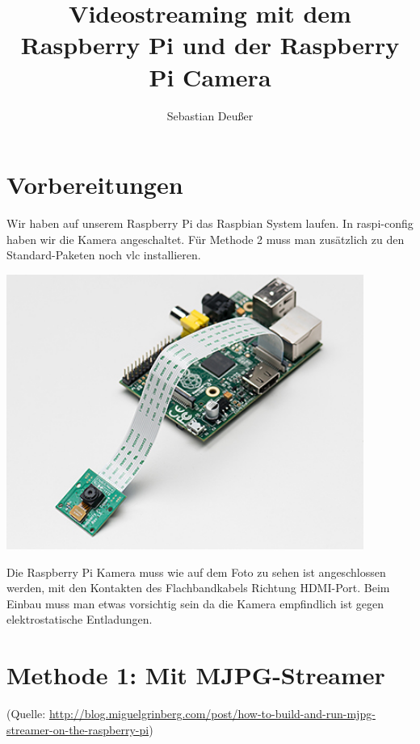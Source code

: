 \documentclass[12pt,a4paper,titlepage]{scrartcl} %
\title{Videostreaming mit dem Raspberry Pi und der Raspberry Pi Camera}
\author{Sebastian Deußer}
\begin{document}
\maketitle %

\pagestyle{fancy}
\lhead{}
\chead{\leftmark}
\rhead{}
\cfoot{}

\thispagestyle{fancy}

\section{Vorbereitungen}
Wir haben auf unserem Raspberry Pi das Raspbian System laufen. In raspi-config haben wir die Kamera angeschaltet. Für Methode 2 muss man zusätzlich zu den Standard-Paketen noch vlc installieren.
	\begin{center}
		\includegraphics[height=9cm]{Streaming/1367_MED}
	\end{center}
Die Raspberry Pi Kamera muss wie auf dem Foto zu sehen ist angeschlossen werden, mit den Kontakten des Flachbandkabels Richtung HDMI-Port. Beim Einbau muss man etwas vorsichtig sein da die Kamera empfindlich ist gegen elektrostatische Entladungen.

\newpage
\section{Methode 1: Mit MJPG-Streamer}
\small{(Quelle: \href{http://blog.miguelgrinberg.com/post/how-to-build-and-run-mjpg-streamer-on-the-raspberry-pi}{http://blog.miguelgrinberg.com/post/how-to-build-and-run-mjpg-streamer-on-the-raspberry-pi})}
\normalsize
\end{document}
